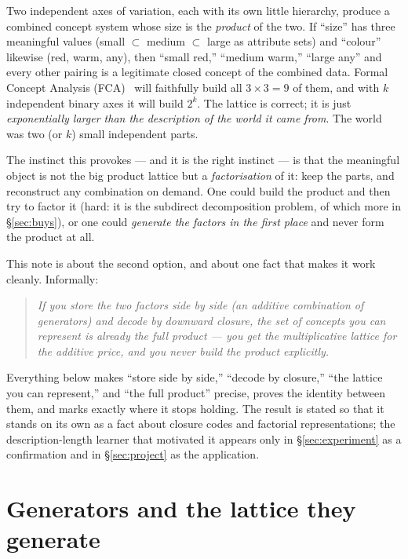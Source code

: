 \documentclass[11pt]{article}
\theoremstyle{definition}
\theoremstyle{plain}
\theoremstyle{remark}
\begin{document}
Two independent axes of variation, each with its own little hierarchy, produce a
combined concept system whose size is the \emph{product} of the two. If
``size'' has three meaningful values (small $\subset$ medium $\subset$ large as
attribute sets) and ``colour'' likewise (red, warm, any), then ``small red,''
``medium warm,'' ``large any'' and every other pairing is a legitimate closed
concept of the combined data. Formal Concept Analysis (FCA)~\cite{ganter1999}
will faithfully build all $3\times 3 = 9$ of them, and with $k$ independent
binary axes it will build $2^{k}$. The lattice is correct; it is just
\emph{exponentially larger than the description of the world it came from}. The
world was two (or $k$) small independent parts.

The instinct this provokes --- and it is the right instinct --- is that the
meaningful object is not the big product lattice but a \emph{factorisation} of
it: keep the parts, and reconstruct any combination on demand. One could
build the product and then try to factor it (hard: it is the subdirect
decomposition problem, of which more in \S\ref{sec:buys}), or one could
\emph{generate the factors in the first place} and never form the product at all.

This note is about the second option, and about one fact that makes it work
cleanly. Informally:

\begin{quote}
\emph{If you store the two factors side by side (an additive combination of
generators) and decode by downward closure, the set of concepts you can
represent is already the full product --- you get the multiplicative lattice for
the additive price, and you never build the product explicitly.}
\end{quote}

Everything below makes ``store side by side,'' ``decode by closure,'' ``the
lattice you can represent,'' and ``the full product'' precise, proves the
identity between them, and marks exactly where it stops holding. The result is
stated so that it stands on its own as a fact about closure codes and factorial
representations; the description-length learner that motivated it appears only in
\S\ref{sec:experiment} as a confirmation and in \S\ref{sec:project} as the
application.

\section{Generators and the lattice they generate}
\label{sec:generators}
\end{document}
